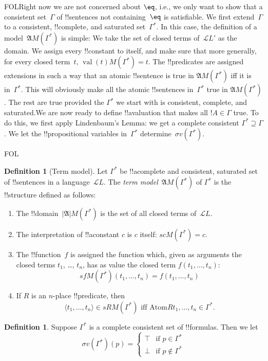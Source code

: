 \documentclass[10pt,a4paper]{article}
\theoremstyle{plain}
\theoremstyle{definition}
\newtheorem{defn}[thm]{Definition}
\theoremstyle{remark}
\newenvironment{explain}{}{}
\newcommand*{\ollabel}[1]{\label{#1}}
\providecommand{\True}{\top}
\providecommand{\False}{\bot}
\providecommand{\Struct}{\ensuremath{\mathfrak{A}}}
\providecommand{\Domain}{\ensuremath{|\mathfrak{A}|}}
\providecommand{\Assign}{\ensuremath{s}}
\providecommand{\Lang}{\ensuremath{\mathcal{L}}}
\providecommand{\tuple}[1]{\langle #1 \rangle}
\providecommand{\iftag}[1]{#1}
\providecommand{\Value}[1]{\operatorname{val}(#1)}
\providecommand{\pAssign}{\sigma}
\providecommand{\Atom}{\mathrm{Atom}}
\begin{document}
\begin{explain}
\iftag{FOL}{Right now we are not concerned about $\eq$, i.e., we only
  want to show that a consistent set~$\Gamma$ of !!{sentence}s not
  containing~$\eq$ is satisfiable. We first extend~$\Gamma$ to a
  consistent, !!{complete}, and saturated set~$\Gamma^*$.  In this
  case, the definition of a model~$\Struct{M(\Gamma^*)}$ is simple: We
  take the set of closed terms of~$\Lang{L'}$ as the domain. We assign
  every !!{constant} to itself, and make sure that more generally, for
  every closed term~$t$, $\Value{t}{M(\Gamma^*)} = t$.  The
  !!{predicate}s are assigned extensions in such a way that an atomic
  !!{sentence} is true in $\Struct{M(\Gamma^*)}$ iff it is
  in~$\Gamma^*$.  This will obviously make all the atomic
  !!{sentence}s in~$\Gamma^*$ true in $\Struct{M(\Gamma^*)}$. The rest
  are true provided the $\Gamma^*$ we start with is consistent,
  complete, and saturated.}{We are now ready to define !!a{valuation}
  that makes all $!A \in \Gamma$ true. To do this, we first apply
  Lindenbaum's Lemma: we get a complete consistent $\Gamma^* \supseteq
  \Gamma$. We let the !!{propositional variable}s in~$\Gamma^*$
  determine~$\pAssign v(\Gamma^*)$.}
\end{explain}

\iftag{FOL}{%
\begin{defn}[Term model]
\ollabel{defn:termmodel}
Let $\Gamma^*$ be !!a{complete} and consistent,
saturated set of !!{sentence}s in a language~$\Lang L$. The \emph{term
  model}~$\Struct M(\Gamma^*)$ of $\Gamma^*$ is the !!{structure}
defined as follows:
\begin{enumerate}
\item The !!{domain}~$\Domain{M(\Gamma^*)}$ is the set of all closed
  terms of~$\Lang L$.
\item The interpretation of !!a{constant} $c$ is $c$ itself:
  $\Assign{c}{M(\Gamma^*)} = c$.
\item The !!{function}~$f$ is assigned the function which, given as
  arguments the closed terms $t_1$, \dots, $t_n$, has as value the
  closed term $f(t_1, \dots, t_n)$:
\[
\Assign{f}{M(\Gamma^*)}(t_1, \dots, t_n) = f(t_1,\dots, t_n)
\]
\item If $R$ is an $n$-place !!{predicate}, then
  \[
  \tuple{t_1, \dots,
  t_n} \in \Assign{R}{M(\Gamma^*)} \text{ iff } \Atom{R}{t_1, \dots,
    t_n} \in \Gamma^*.
  \]
\end{enumerate}
\end{defn}
}{%
\begin{defn}
\ollabel{defn:termmodel}
Suppose $\Gamma^*$ is a complete consistent set of !!{formula}s. Then we let
\[
\pAssign v(\Gamma^*)(p) = \begin{cases}
  \True & \text{if $p \in \Gamma^*$}\\
  \False & \text{if $p \notin \Gamma^*$}
  \end{cases}
\]
\end{defn}
}
\end{document}
